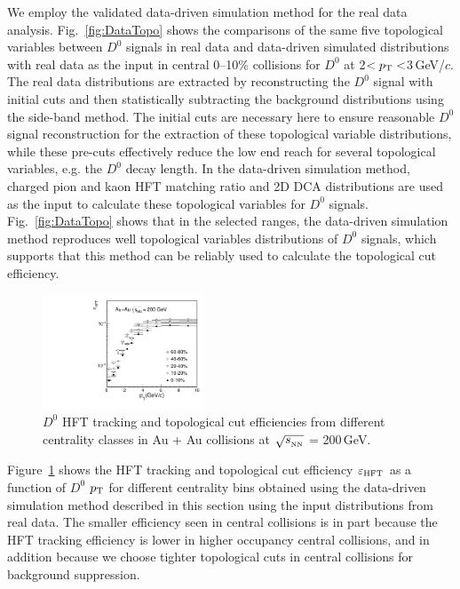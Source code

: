 \documentclass[%
 reprint,	
 amsmath,amssymb,
 aps,
 prc,
]{revtex4-1}
\begin{document}
We employ the validated data-driven simulation method for the real data analysis. Fig.~\ref{fig:DataTopo} shows the comparisons of the same five topological variables between $D^0$ signals in real data and data-driven simulated distributions with real data as the input in central 0--10\% collisions for $D^0$ at 2$<p_{\rm T}<$3\,GeV/$c$. The real data distributions are extracted by reconstructing the $D^0$ signal with initial cuts and then statistically subtracting the background distributions using the side-band method. The initial cuts are necessary here to ensure reasonable $D^0$ signal reconstruction for the extraction of these topological variable distributions, while these pre-cuts effectively reduce the low end reach for several topological variables, e.g. the $D^0$ decay length. In the data-driven simulation method, charged pion and kaon HFT matching ratio and 2D DCA distributions are used as the input to calculate these topological variables for $D^0$ signals. Fig.~\ref{fig:DataTopo} shows that in the selected ranges, the data-driven simulation method reproduces well topological variables distributions of $D^0$ signals, which supports that this method can be reliably used to calculate the topological cut efficiency.

\begin{figure}[h]
\centering
\includegraphics[width=0.43\textwidth]{fig/Datad0Eff_hftTopo_10.pdf}
\caption{$D^{0}$ HFT tracking and topological cut efficiencies from different centrality classes in Au + Au collisions at $\sqrt{s_{_{\rm NN}}}$ = 200\,GeV.}
\label{fig:Datad0Eff_hftTopo} 
\end{figure}


Figure~\ref{fig:Datad0Eff_hftTopo} shows the HFT tracking and topological cut efficiency $\varepsilon_{\rm HFT}$ as a function of $D^0$ $p_{\rm T}$ for different centrality bins obtained using the data-driven simulation method described in this section using the input distributions from real data. The smaller efficiency seen in central collisions is in part because the HFT tracking efficiency is lower in higher occupancy central collisions, and in addition because we choose tighter topological cuts in central collisions for background suppression.
\end{document}
